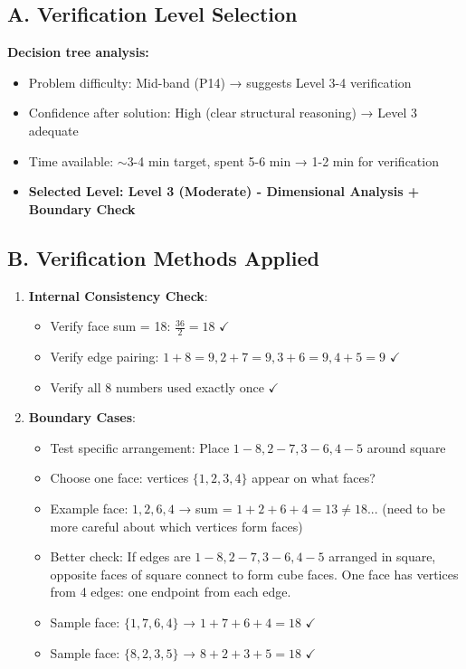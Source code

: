 \documentclass[]{article}
\begin{document}
\begin{verificationbox}
\subsection*{A. Verification Level Selection}
\textbf{Decision tree analysis:}
\begin{itemize}[leftmargin=*]
    \item Problem difficulty: Mid-band (P14) → suggests Level 3-4 verification
    \item Confidence after solution: High (clear structural reasoning) → Level 3 adequate
    \item Time available: $\sim$3-4 min target, spent 5-6 min → 1-2 min for verification
    \item \textbf{Selected Level: Level 3 (Moderate) - Dimensional Analysis + Boundary Check}
\end{itemize}

\subsection*{B. Verification Methods Applied}
\begin{enumerate}[leftmargin=*]
    \item \textbf{Internal Consistency Check}:
    \begin{itemize}
        \item Verify face sum = 18: $\frac{36}{2} = 18$ $\checkmark$
        \item Verify edge pairing: $1+8=9, 2+7=9, 3+6=9, 4+5=9$ $\checkmark$
        \item Verify all 8 numbers used exactly once $\checkmark$
    \end{itemize}
    
    \item \textbf{Boundary Cases}:
    \begin{itemize}
        \item Test specific arrangement: Place $1-8, 2-7, 3-6, 4-5$ around square
        \item Choose one face: vertices $\{1, 2, 3, 4\}$ appear on what faces?
        \item Example face: $1, 2, 6, 4$ → sum = $1+2+6+4 = 13 \neq 18$... (need to be more careful about which vertices form faces)
        \item Better check: If edges are $1-8, 2-7, 3-6, 4-5$ arranged in square, opposite faces of square connect to form cube faces. One face has vertices from 4 edges: one endpoint from each edge.
        \item Sample face: $\{1, 7, 6, 4\}$ → $1+7+6+4 = 18$ $\checkmark$
        \item Sample face: $\{8, 2, 3, 5\}$ → $8+2+3+5 = 18$ $\checkmark$
    \end{itemize}
    

\end{enumerate}
\end{verificationbox}
\end{document}
